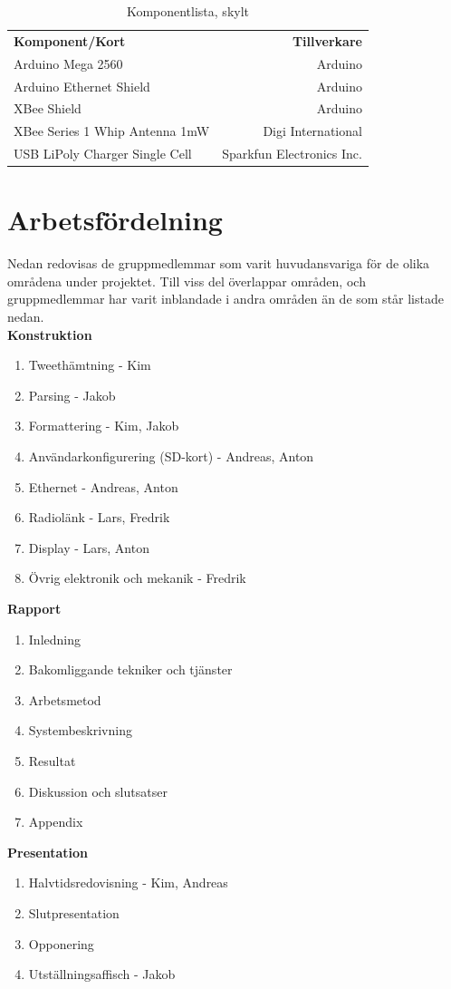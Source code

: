 \documentclass[a4paper,11pt]{article}
\begin{document}
\begin{table}[h]
\centering
	\begin{tabular}{|l|r|}
	{\bf Komponent/Kort} & {\bf Tillverkare} \\
	Arduino Mega 2560                  & Arduino \\
	Arduino Ethernet Shield            & Arduino \\
	XBee Shield                        & Arduino \\
	XBee Series 1 Whip Antenna 1mW     & Digi International \\
	USB LiPoly Charger Single Cell     & Sparkfun Electronics Inc. \\
	\end{tabular}
\caption{Komponentlista, skylt}
\label{tab:korttable_skylt}
\end{table}
\pagebreak

\section{Arbetsfördelning}
Nedan redovisas de gruppmedlemmar som varit huvudansvariga för de olika områdena under projektet. Till viss del överlappar områden, och gruppmedlemmar har varit inblandade i andra områden än de som står listade nedan.\\

{\bf Konstruktion}
	\begin{enumerate}
    	\item Tweethämtning - Kim
    	\item Parsing - Jakob
    	\item Formattering - Kim, Jakob
    	\item Användarkonfigurering (SD-kort) - Andreas, Anton
    	\item Ethernet - Andreas, Anton
    	\item Radiolänk - Lars, Fredrik
    	\item Display - Lars, Anton
    	\item Övrig elektronik och mekanik - Fredrik\\
    	\end{enumerate}
{\bf Rapport}
	\begin{enumerate}
    	\item Inledning
    	\item Bakomliggande tekniker och tjänster
    	\item Arbetsmetod
    	\item Systembeskrivning
    	\item Resultat
    	\item Diskussion och slutsatser\\
    	\item Appendix
	\end{enumerate}
{\bf Presentation}
	\begin{enumerate}
 	\item Halvtidsredovisning - Kim, Andreas
    	\item Slutpresentation
    	\item Opponering
    	\item Utställningsaffisch - Jakob\\
	\end{enumerate}
		
\end{document}
